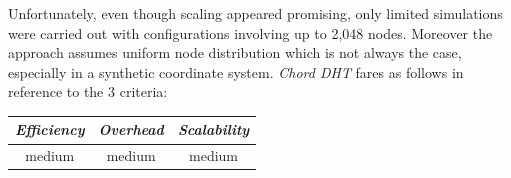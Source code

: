 %
%
Unfortunately, even though scaling appeared promising, only limited 
simulations were carried out with configurations involving up to 2,048 nodes.
Moreover the approach assumes uniform node distribution which
is not always the case, especially in a synthetic coordinate system.
\emph{Chord DHT} fares as follows in reference to the $3$ criteria:
\begin{center}
{\footnotesize
\begin{tabular}{ccc}
\emph{Efficiency} & \emph{Overhead} & \emph{Scalability} \\
\hline
%
medium &
%
medium &
%
medium
\end{tabular}
}
\end{center}



